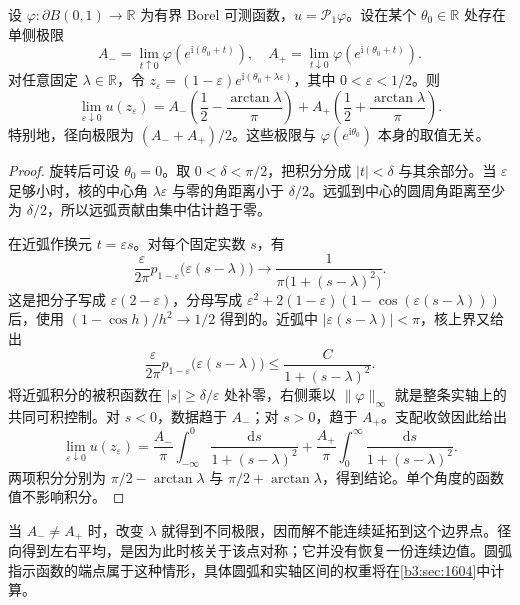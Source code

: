 \begin{proposition}[跳跃边值的方向极限]\label{b3:prop:16-poisson-jump}
设 \(\varphi:\partial B(0,1)\to\mathbb R\) 为有界 Borel 可测函数，\(u=\mathcal P_1\varphi\)。设在某个 \(\theta_0\in\mathbb R\) 处存在单侧极限
\[
 A_-=\lim_{t\uparrow0}\varphi(e^{\mathrm i(\theta_0+t)}),
 \quad
 A_+=\lim_{t\downarrow0}\varphi(e^{\mathrm i(\theta_0+t)}).
\]
对任意固定 \(\lambda\in\mathbb R\)，令
\(z_\varepsilon=(1-\varepsilon)e^{\mathrm i(\theta_0+\lambda\varepsilon)}\)，其中 \(0<\varepsilon<1/2\)。则
\[
 \lim_{\varepsilon\downarrow0}u(z_\varepsilon)
 =A_-\left(\frac12-\frac{\arctan\lambda}{\pi}\right)
  +A_+\left(\frac12+\frac{\arctan\lambda}{\pi}\right).
\]
特别地，径向极限为 \((A_-+A_+)/2\)。这些极限与
\(\varphi(e^{\mathrm i\theta_0})\) 本身的取值无关。
\end{proposition}
\begin{proof}
旋转后可设 \(\theta_0=0\)。取 \(0<\delta<\pi/2\)，把积分分成 \(|t|<\delta\) 与其余部分。当 \(\varepsilon\) 足够小时，核的中心角 \(\lambda\varepsilon\) 与零的角距离小于 \(\delta/2\)。远弧到中心的圆周角距离至少为 \(\delta/2\)，所以远弧贡献由集中估计趋于零。

在近弧作换元 \(t=\varepsilon s\)。对每个固定实数 \(s\)，有
\[
 \frac{\varepsilon}{2\pi}
 p_{1-\varepsilon}\bigl(\varepsilon(s-\lambda)\bigr)
 \longrightarrow\frac1{\pi\bigl(1+(s-\lambda)^2\bigr)}.
\]
这是把分子写成 \(\varepsilon(2-\varepsilon)\)，分母写成
\(\varepsilon^2+2(1-\varepsilon)(1-\cos(\varepsilon(s-\lambda)))\)
后，使用 \((1-\cos h)/h^2\to1/2\) 得到的。近弧中
\(|\varepsilon(s-\lambda)|<\pi\)，核上界又给出
\[
 \frac{\varepsilon}{2\pi}
 p_{1-\varepsilon}\bigl(\varepsilon(s-\lambda)\bigr)
 \le\frac{C}{1+(s-\lambda)^2}.
\]
将近弧积分的被积函数在 \(|s|\ge\delta/\varepsilon\) 处补零，右侧乘以 \(\|\varphi\|_\infty\) 就是整条实轴上的共同可积控制。对 \(s<0\)，数据趋于 \(A_-\)；对 \(s>0\)，趋于 \(A_+\)。支配收敛因此给出
\[
 \lim_{\varepsilon\downarrow0}u(z_\varepsilon)
 =\frac{A_-}{\pi}\int_{-\infty}^{0}
       \frac{\mathrm ds}{1+(s-\lambda)^2}
  +\frac{A_+}{\pi}\int_{0}^{\infty}
       \frac{\mathrm ds}{1+(s-\lambda)^2}.
\]
两项积分分别为 \(\pi/2-\arctan\lambda\) 与
\(\pi/2+\arctan\lambda\)，得到结论。单个角度的函数值不影响积分。
\end{proof}

当 \(A_-\ne A_+\) 时，改变 \(\lambda\) 就得到不同极限，因而解不能连续延拓到这个边界点。径向得到左右平均，是因为此时核关于该点对称；它并没有恢复一份连续边值。圆弧指示函数的端点属于这种情形，具体圆弧和实轴区间的权重将在\cref{b3:sec:1604}中计算。

